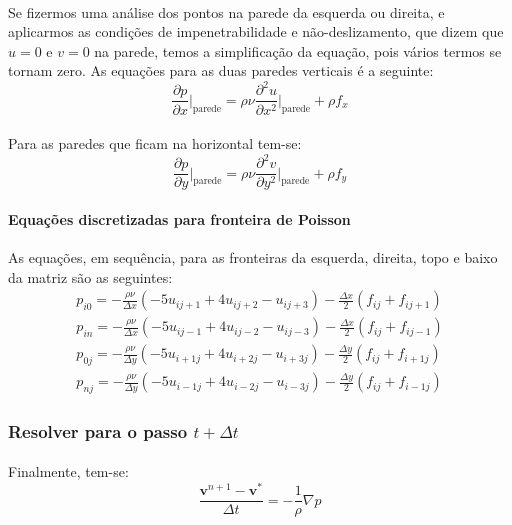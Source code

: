 \documentclass[a4paper,11pt]{article}
\begin{document}
\paragraph{} Se fizermos uma análise dos pontos na parede da esquerda ou
direita, e aplicarmos as condições de impenetrabilidade e não-deslizamento, que
dizem que $u=0$ e $v=0$ na parede, temos a simplificação da equação, pois vários
termos se tornam zero. As equações para as duas paredes verticais é a seguinte:
\begin{equation}
\frac{\partial p}{\partial x}\Bigg|_{\textrm{parede}}=\rho\nu\frac{\partial^2
u}{\partial x^2}\Bigg|_{\textrm{parede}}+\rho f_x
\end{equation}
\paragraph{} Para as paredes que ficam na horizontal tem-se:
\begin{equation}
\frac{\partial p}{\partial y}\Bigg|_{\textrm{parede}}=\rho\nu\frac{\partial^2
v}{\partial y^2}\Bigg|_{\textrm{parede}}+\rho f_y
\end{equation}
\paragraph{Equações discretizadas para fronteira de Poisson} As equações, em
sequência, para as fronteiras da esquerda, direita, topo e baixo da matriz são
as seguintes:
\begin{eqnarray}
p_{i0}=-\frac{\rho\nu}{\Delta x}(-5u_{ij+1}+4u_{ij+2}-u_{ij+3})-\frac{\Delta
x}{2}(f_{ij}+f_{ij+1})\\
p_{in}=-\frac{\rho\nu}{\Delta x}(-5u_{ij-1}+4u_{ij-2}-u_{ij-3})-\frac{\Delta
x}{2}(f_{ij}+f_{ij-1})\\
p_{0j}=-\frac{\rho\nu}{\Delta y}(-5u_{i+1j}+4u_{i+2j}-u_{i+3j})-\frac{\Delta
y}{2}(f_{ij}+f_{i+1j})\\
p_{nj}=-\frac{\rho\nu}{\Delta y}(-5u_{i-1j}+4u_{i-2j}-u_{i-3j})-\frac{\Delta
y}{2}(f_{ij}+f_{i-1j})
\end{eqnarray}

\subsubsection{Resolver para o passo $t+\Delta t$}
\paragraph{} Finalmente, tem-se:
\begin{equation}
\frac{\textbf{v}^{n+1}-\textbf{v}^*}{\Delta t}=-\frac{1}{\rho}\nabla p
\end{equation}
\end{document}

